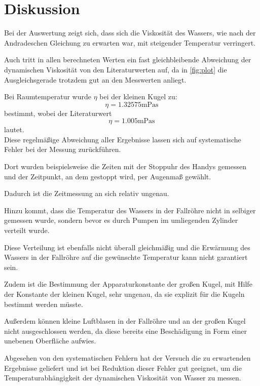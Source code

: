 \section{Diskussion}
\label{sec:Diskussion}
Bei der Auswertung zeigt sich, dass sich die Viskosität des Wassers, wie nach der Andradeschen Gleichung zu erwarten war,
mit steigender Temperatur verringert. 

Auch tritt in allen berechneten Werten ein fast gleichbleibende Abweichung
der dynamischen Viskosität von den Literaturwerten auf, 
da in \autoref{fig:plot} die Ausgleichsgerade trotzdem gut an den Messwerten anliegt.

Bei Raumtemperatur wurde $\eta$ bei der kleinen Kugel zu:
\begin{equation*}
    \eta = 1.32575\unit{\milli\pascal\second}
\end{equation*}
bestimmt, wobei der Literaturwert
\begin{equation*}
    \eta = 1.005\unit{\milli\pascal\second}
\end{equation*}
lautet.\\

Diese regelmäßige Abweichung aller Ergebnisse lassen sich auf systematische Fehler bei der Messung zurückführen.

Dort wurden beispielsweise die Zeiten mit der Stoppuhr des Handys gemessen und der Zeitpunkt, an dem
gestoppt wird, per Augenmaß gewählt. 

Dadurch ist die Zeitmessung an sich relativ ungenau. 

Hinzu kommt, dass die Temperatur des Wassers in der Fallröhre nicht in selbiger 
gemessen wurde, sondern bevor es durch Pumpen
im umliegenden Zylinder verteilt wurde. 

Diese Verteilung ist ebenfalls nicht überall gleichmäßig und die Erwärmung des
Wassers in der Fallröhre auf die gewünschte Temperatur kann nicht garantiert sein. 

Zudem ist die Bestimmung der Apparaturkonstante
der großen Kugel, mit Hilfe der Konstante der kleinen Kugel, sehr ungenau, da sie 
explizit für die Kugeln bestimmt werden müsste. 

Außerdem können kleine Luftblasen
in der Fallröhre und an der großen Kugel nicht ausgeschlossen werden, 
da diese bereits eine Beschädigung in Form einer unebenen Oberfläche aufwies.

Abgesehen von den systematischen Fehlern hat der Versuch die zu erwartenden Ergebnisse geliefert 
und ist bei Reduktion dieser Fehler gut geeignet, 
um die Temperaturabhängigkeit der dynamischen Viskosität von Wasser zu messen.
